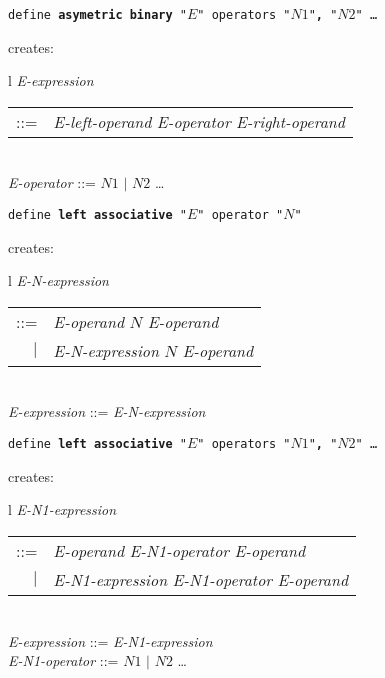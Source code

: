 \documentclass[12pt]{article}
\newcommand{\TT}[1]{{\tt \bfseries #1}}
\newenvironment{indpar}[1][0.3in]%
	{\begin{list}{}%
		     {\setlength{\itemsep}{0in}%
		      \setlength{\topsep}{0in}%
		      \setlength{\parsep}{1ex}%
		      \setlength{\labelwidth}{#1}%
		      \setlength{\leftmargin}{#1}%
		      \addtolength{\leftmargin}{\labelsep}}%
	 \item}%
	{\end{list}}
\begin{document}
\begin{indpar}
{\tt define \TT{asymetric binary} "$E$" operators "$N1$"\TT{,} "$N2$" \ldots}
\begin{indpar}
creates: \begin{tabular}[t]{l}
         {\em E-expression} \begin{tabular}[t]{rl}
                            ::= & {\em E-left-operand} {\em E-operator}
			          {\em E-right-operand} \\
                            \end{tabular} \\
         {\em E-operator} ::= $N1$ $|$ $N2$ \ldots \\
	 \end{tabular}
\end{indpar}

{\tt define \TT{left associative} "$E$" operator "$N$"}
\begin{indpar}
creates: \begin{tabular}[t]{l}
         {\em E-N-expression} \begin{tabular}[t]{rl}
                            ::= & {\em E-operand} $N$ {\em E-operand} \\
                            $|$ & {\em E-N-expression} $N$ {\em E-operand} \\
                            \end{tabular} \\
         {\em E-expression} ::= {\em E-N-expression} \\
	 \end{tabular}
\end{indpar}

{\tt define \TT{left associative} "$E$" operators "$N1$"\TT{,} "$N2$" \ldots}
\begin{indpar}
creates: \begin{tabular}[t]{l}
         {\em E-N1-expression} \begin{tabular}[t]{rl}
                            ::= & {\em E-operand} {\em E-N1-operator}
			          {\em E-operand} \\
                            $|$ & {\em E-N1-expression} {\em E-N1-operator}
			          {\em E-operand} \\
                            \end{tabular} \\
         {\em E-expression} ::= {\em E-N1-expression} \\
         {\em E-N1-operator} ::= $N1$ $|$ $N2$ \ldots \\
	 \end{tabular}
\end{indpar}


\end{indpar}
\end{document}

